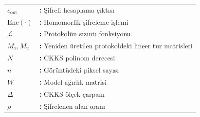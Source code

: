 \hspace{-3mm}
\begin{tabular}{p{2.5cm}l}
$c_{\mathrm{out}}$ & {\bf:} Şifreli hesaplama çıktısı\\
$\mathrm{Enc}(\cdot)$ & {\bf:} Homomorfik şifreleme işlemi\\
$\mathcal{L}$ & {\bf:} Protokolün sızıntı fonksiyonu\\
$M_1, M_2$ & {\bf:} Yeniden üretilen protokoldeki lineer tur matrisleri\\
$N$ & {\bf:} CKKS polinom derecesi\\
$n$ & {\bf:} Görüntüdeki piksel sayısı\\
$W$ & {\bf:} Model ağırlık matrisi\\
$\Delta$ & {\bf:} CKKS ölçek çarpanı\\
$\rho$ & {\bf:} Şifrelenen alan oranı\\
\end{tabular}
